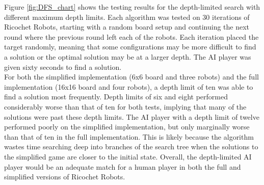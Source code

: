 \documentclass[a4paper,10pt]{article}
\begin{document}
  Figure \ref{fig:DFS_chart} shows the testing results for the depth-limited search with different maximum depth limits.  Each algorithm was tested on 30 iterations of Ricochet Robots, starting with a random board setup and continuing the next round where the previous round left each of the robots.  Each iteration placed the target randomly, meaning that some configurations may be more difficult to find a solution or the optimal solution may be at a larger depth.  The AI player was given sixty seconds to find a solution. \\
  For both the simplified implementation (6x6 board and three robots) and the full implementation (16x16 board and four robots), a depth limit of ten was able to find a solution most frequently.  Depth limits of six and eight performed considerably worse than that of ten for both tests, implying that many of the solutions were past these depth limits.  The AI player with a depth limit of twelve performed poorly on the simplified implementation, but only marginally worse than that of ten in the full implementation.  This is likely because the algorithm wastes time searching deep into branches of the search tree when the solutions to the simplified game are closer to the initial state.  Overall, the depth-limited AI player would be an adequate match for a human player in both the full and simplified versions of Ricochet Robots.\\
\end{document}
